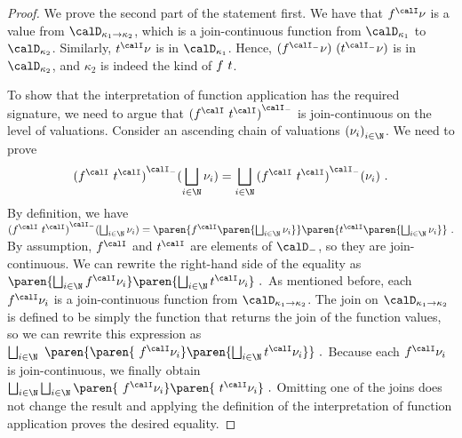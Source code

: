 \documentclass[../../diss.tex]{subfiles}
\begin{document}
\begin{proof}
    We prove the second part of the statement first.
    We have that $f^\interpretation \val$ is a value from $\domain{\kappa_1 \to \kappa_2}$, which is a join-continuous function from $\domain{\kappa_1}$ to $\domain{\kappa_2}$.
    Similarly, $t^\interpretation \val$ is in $\domain{\kappa_1}$.
    Hence, $(f^\interpretationt \val) \appl (t^\interpretationt \val)$ is in $\domain{\kappa_2}$, and $\kappa_2$ is indeed the kind of $f \  t$.

    To show that the interpretation of function application has the required signature, we need to argue that ${(f^\interpretation \appl t^\interpretation)}^\interpretationt$ is join-continuous on the level of valuations.
    Consider an ascending chain of valuations ${(\val_i)}_{i \in \N}$.
    We need to prove
    \[
        {(f^\interpretation \appl t^\interpretation)}^\interpretationt (\bigsqcup_{i \in \N} \val_i)
        =
        \bigsqcup_{i \in \N}
        {(f^\interpretation \appl t^\interpretation)}^\interpretationt (\val_i)
        \ .
    \]
    By definition, we have
    \(
        {(f^\interpretation \appl t^\interpretation)}^\interpretationt (\bigsqcup_{i \in \N} \val_i)
        = \paren{ f^\interpretation  \paren{\bigsqcup_{i \in \N} \val_i} } \paren{ t^\interpretation  \paren{\bigsqcup_{i \in \N} \val_i} }
        \ .
    \)
    By assumption, $f^\interpretation$ and $t^\interpretation$ are elements of $\domaint$, so they are join-continuous.
    We can rewrite the right-hand side of the equality as
    \(
        \paren{ \bigsqcup_{i \in \N} f^\interpretation \val_i }
        \paren{ \bigsqcup_{i \in \N}  t^\interpretation \val_i }
        \ .
    \)
    As mentioned before, each $f^\interpretation \val_i$ is a join-continuous function from $\domain{\kappa_1 \to \kappa_2}$.
    The join on $\domain{\kappa_1 \to \kappa_2}$ is defined to be simply the function that returns the join of the function values, so we can rewrite this expression as
    \(
        \bigsqcup_{i \in \N} \ \paren{
            \paren{ \ f^\interpretation \val_i }
            \paren{ \bigsqcup_{i \in \N}  t^\interpretation \val_i }
        }
        \ .
    \)
    Because each $f^\interpretation \val_i$ is join-continuous, we finally obtain
    \(
        \bigsqcup_{i \in \N}
        \bigsqcup_{i \in \N}
        \paren{ \ f^\interpretation \val_i }
        \paren{ \ t^\interpretation \val_i }
        \ .
    \)
    Omitting one of the joins does not change the result and applying the definition of the interpretation of function application proves the desired equality.
\end{proof}
\end{document}
